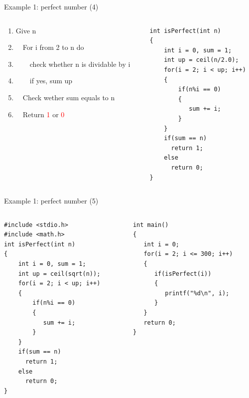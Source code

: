 \begin{frame}[fragile]{Example 1: perfect number (4)}
\vspace{-0.15in}
\begin{columns}
\begin{column}{0.55\linewidth}
\begin{enumerate}
	\item {Give n}
	\item {~~For i from 2 to n do}
	\item {~~~~check whether n is dividable by i}
	\item {~~~~if yes, sum up}
	\item {~~Check wether sum equals to n}
	\item {~~Return \textcolor{red}{1} or \textcolor{red}{0}}
\end{enumerate}
\end{column}
\begin{column}{0.45\linewidth}
\begin{lstlisting}
int isPerfect(int n)
{
    int i = 0, sum = 1;
    int up = ceil(n/2.0);
    for(i = 2; i < up; i++)
    {
        if(n%i == 0)
        {
           sum += i;
        }
    }
    if(sum == n)
      return 1;
    else 
      return 0;
}
\end{lstlisting}
\end{column}
\end{columns}
\end{frame}

\begin{frame}[fragile]{Example 1: perfect number (5)}
\vspace{-0.16in}
\begin{columns}
\begin{column}{0.48\linewidth}
\begin{lstlisting}[linewidth=0.95\linewidth]
#include <stdio.h>
#include <math.h>
int isPerfect(int n)
{
    int i = 0, sum = 1;
    int up = ceil(sqrt(n));
    for(i = 2; i < up; i++)
    {
        if(n%i == 0)
        {
           sum += i;
        }
    }
    if(sum == n)
      return 1;
    else 
      return 0;
}
\end{lstlisting}
\end{column}
\begin{column}{0.48\linewidth}
\begin{lstlisting}[firstnumber=19, linewidth=0.95\linewidth]
int main()
{
   int i = 0;
   for(i = 2; i <= 300; i++)
   {
      if(isPerfect(i))
      {
         printf("%d\n", i);
      }
   }
   return 0;
}
\end{lstlisting}
\end{column}
\end{columns}
\end{frame}